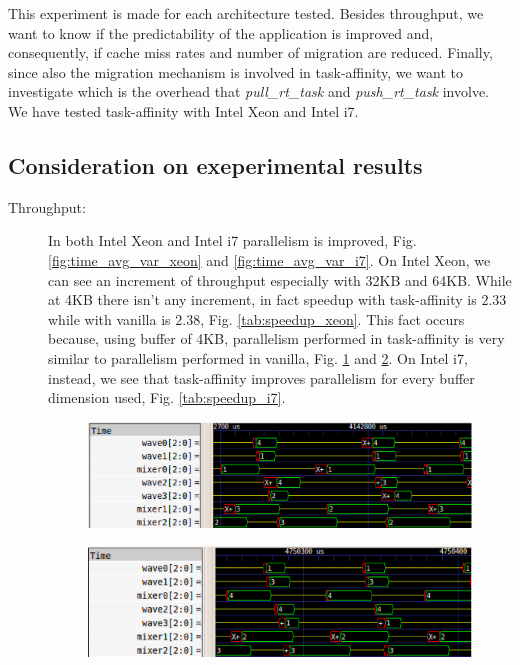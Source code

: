 This experiment is made for each architecture tested. Besides throughput, we want to know if the predictability of the application is improved and, 
consequently, if cache miss rates and number of migration are reduced. Finally, since also the migration mechanism is involved in task-affinity, we want 
to investigate which is the overhead that \textit{pull\_rt\_task} and \textit{push\_rt\_task} involve. We have tested task-affinity with Intel Xeon and 
Intel i7.

\subsection{Consideration on exeperimental results}

\begin{description}

\item[Throughput:] In both Intel Xeon and Intel i7 parallelism is improved, Fig. \ref{fig:time_avg_var_xeon} and \ref{fig:time_avg_var_i7}. On Intel Xeon, 
we can see an increment of throughput especially with 32KB and 64KB. While at 4KB there isn't any increment, in fact speedup with task-affinity is $2.33$ 
while with vanilla is $2.38$, Fig. \ref{tab:speedup_xeon}. This fact occurs because, using buffer of 4KB, parallelism performed in task-affinity is very 
similar to parallelism performed in vanilla, Fig. \ref{fig:4KB_xeon_results_taskaff} and \ref{fig:4KB_xeon_results_van}. On Intel i7, instead, we see that 
task-affinity improves parallelism for every buffer dimension used, Fig. \ref{tab:speedup_i7}.

\begin{figure}[htbp]
\centering
\includegraphics[width=\widefigure]{images/results_xeon/4KB_results_xeon_taskaff.eps}
\caption{}
\label{fig:4KB_xeon_results_taskaff}
\end{figure}

\begin{figure}[htbp]
\centering
\includegraphics[width=\widefigure]{images/results_xeon/4KB_results_xeon_van.eps}
\caption{}
\label{fig:4KB_xeon_results_van}
\end{figure}


\end{description}
